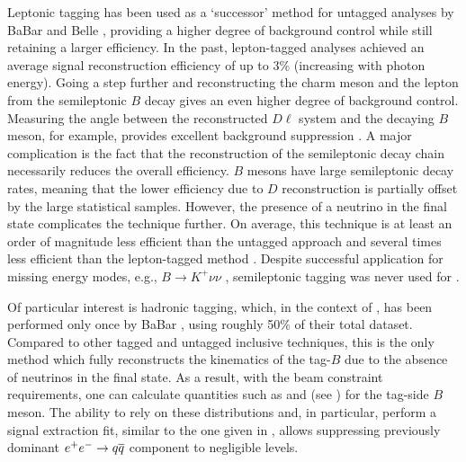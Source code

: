 Leptonic tagging has been used as a `successor' method for \BtoXsgamma untagged analyses by BaBar and Belle \cite{Belle:2009nth,BaBar:2012fqh,Belle:2016ufb}, providing a higher degree of background control while still retaining a larger efficiency.
In the past, lepton-tagged analyses achieved an average signal reconstruction efficiency of up to $3\%$ (increasing with photon energy).
Going a step further and reconstructing the charm meson and the lepton from the semileptonic $B$ decay gives an even higher degree of background control.
Measuring the angle between the reconstructed $D\ell$ system and the decaying $B$ meson, for example, provides excellent background suppression \cite{BaBar:2014omp}.
A major complication is the fact that the reconstruction of the semileptonic decay chain necessarily reduces the overall efficiency.
$B$ mesons have large semileptonic decay rates, meaning that the lower efficiency due to $D$ reconstruction is partially offset by the large statistical samples.
However, the presence of a neutrino in the final state complicates the technique further.
On average, this technique is at least an order of magnitude less efficient than the untagged approach and several times less efficient than the lepton-tagged method \cite{Belle-II:2018jsg}.
Despite successful application for missing energy modes, e.g., $B\rightarrow K^+\nu\nu$ \cite{BaBar:2009qvi}, semileptonic tagging was never used for \BtoXsgamma.

Of particular interest is hadronic tagging, which, in the context of \BtoXsgamma, has been performed only once by BaBar \cite{BaBar:2007yhb}, using roughly 50\% of their total dataset.
Compared to other tagged and untagged inclusive techniques, this is the only method which fully reconstructs the kinematics of the tag-$B$ due to the absence of neutrinos in the final state.
As a result, with the beam constraint requirements, one can calculate quantities such as \Mbc and \DeltaE (see ) for the tag-side $B$ meson.
The ability to rely on these distributions and, in particular, perform a signal extraction fit, similar to the one given in , allows suppressing previously dominant $e^+e^-\rightarrow q\overline q$ component to negligible levels.

